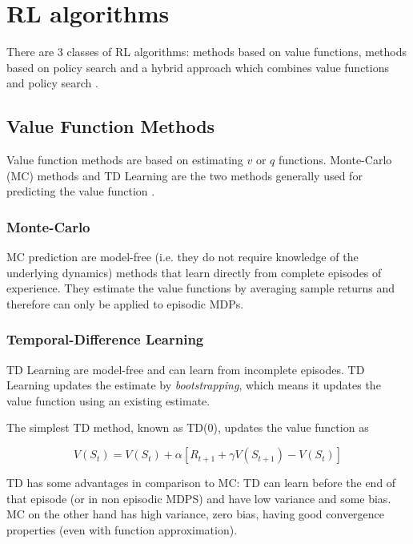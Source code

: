 \section{RL algorithms}

There are 3 classes of RL algorithms: methods based on value functions, methods based on policy search and a hybrid approach
which combines value functions and policy search \cite{Sutton1998}.

\subsection{Value Function Methods}

Value function methods are based on estimating $v$ or $q$ functions.
Monte-Carlo (MC) methods and TD Learning are the two methods generally used for predicting the value function \cite{Sutton1998}.

\subsubsection{Monte-Carlo}

MC prediction are model-free (i.e. they do not require knowledge of the underlying dynamics) methods that learn directly from complete episodes of experience.
They estimate the value functions by averaging sample returns and therefore can only be applied to episodic MDPs.

\subsubsection{Temporal-Difference Learning}

TD Learning are model-free and can learn from incomplete episodes. TD Learning updates the estimate by \textit{bootstrapping}, which
means it updates the value function using an existing estimate.

The simplest TD method, known as TD($0$), updates the value function as

\begin{equation}
    V(S_t) = V(S_t) + \alpha [R_{t+1} + \gamma V(S_{t+1}) - V(S_t)]
    \label{eq:td_learning}
\end{equation}

TD has some advantages in comparison to MC: TD can learn before the end of that episode (or in non episodic MDPS) and have low variance and some bias.
MC on the other hand has high variance, zero bias, having good convergence properties (even with function approximation). 

